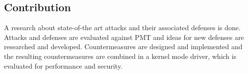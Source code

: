 \subsection{Contribution}
A research about state-of-the art attacks and their associated defenses is done. Attacks and defenses are evaluated against \gls{PMT} and ideas for new defenses are researched and developed. Countermeasures are designed and implemented and the resulting countermeasures are combined in a kernel mode driver, which is evaluated for performance and security.